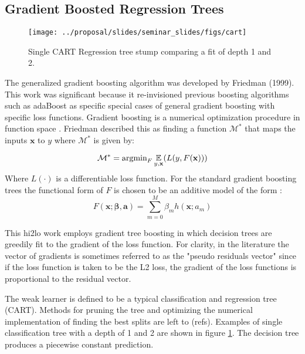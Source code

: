 \subsection{Gradient Boosted Regression Trees}

\begin{figure}[H]
    \centering
    \texttt{[image: ../proposal/slides/seminar\_slides/figs/cart]}
    \caption[Regression tree stump.]{Single CART Regression tree stump comparing a fit of depth 1 and 2.}
    \label{fig:cart}
\end{figure}

The generalized gradient boosting algorithm was developed by Friedman (1999).  This work was significant because it re-invisioned previous boosting algorithms such as adaBoost as specific special cases of general gradient boosting with specific loss functions.  Gradient boosting is a numerical optimization procedure in function space \cite{friedman2001}.  Friedman described this as finding a function $\mathcal M^*$ that maps the inputs $\mathbf x$ to $y$ where $\mathcal M^*$ is given by:

\begin{equation}
\mathcal M^* = \text{argmin}_F \operatorname*{\mathbb{E}}_{y, \mathbf x} (L(y, F(\mathbf x)))
\end{equation}
Where $L(\cdot)$ is a differentiable loss function.  For the standard gradient boosting trees the functional form of $F$ is chosen to be an additive model of the form \cite{friedman2001}:
\begin{equation}
F(\mathbf x; \mathbf{\beta}, \mathbf a) = \sum_{m=0}^M \beta_m h(\mathbf x; a_m)
\end{equation} 

This hi2lo work employs gradient tree boosting in which decision trees are greedily fit to the gradient of the loss function.  For clarity, in the literature the vector of gradients is sometimes referred to as the "pseudo residuals vector" since if the loss function is taken to be the L2 loss, the gradient of the loss functions is proportional to the residual vector.  

The  weak learner is defined to be a typical classification and regression tree (CART).  Methods for pruning the tree and optimizing the numerical implementation of finding the best splits are left to (refs).  Examples of single classification tree with a depth of 1 and 2 are shown in figure \ref{fig:cart}.  The decision tree produces a piecewise constant prediction.

